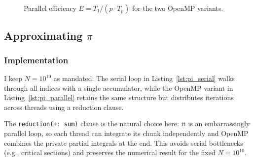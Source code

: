 \begin{figure}[H]
    \centering
    \caption{Parallel efficiency $E = T_1 / (p \cdot T_p)$ for the two OpenMP variants.}
    \label{fig:dotprod_eff}
\end{figure}




\subsection{Approximating $\pi$}

\subsubsection{Implementation}
I keep $N = 10^{10}$ as mandated. The serial loop in Listing~\ref{lst:pi_serial} walks through all indices with a single accumulator, while the OpenMP variant in Listing~\ref{lst:pi_parallel} retains the same structure but distributes iterations across threads using a reduction clause.





The \texttt{reduction(+:\,sum)} clause is the natural choice here: it is an embarrassingly parallel loop, so each thread can integrate its chunk independently and OpenMP combines the private partial integrals at the end. This avoids serial bottlenecks (e.g., critical sections) and preserves the numerical result for the fixed $N = 10^{10}$.

